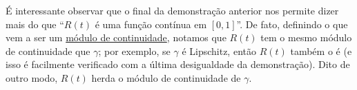 É interessante observar que o final da demonstração anterior nos permite dizer
mais do que ``$R(t)$ é uma função contínua em $[0,1]$''. De fato, definindo o que
vem a ser um 
\href{https://en.wikipedia.org/wiki/Modulus_of_continuity}{módulo de continuidade},
notamos que $R(t)$ tem o mesmo módulo de continuidade que $\gamma$; por exemplo, se
$\gamma$ é Lipschitz, então $R(t)$ também o é 
(e isso é facilmente verificado com a última desigualdade da demonstração).
Dito de outro modo, $R(t)$ herda o módulo de continuidade de $\gamma$.